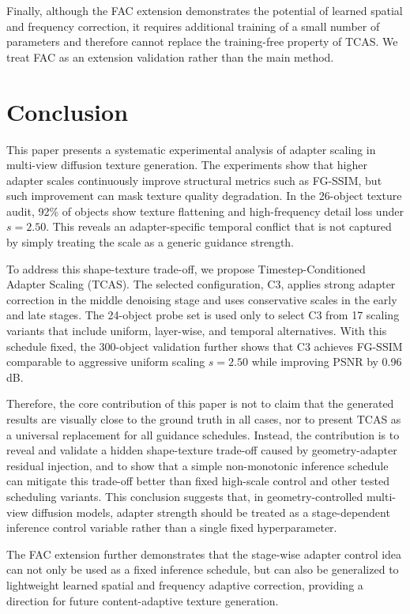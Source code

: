 \documentclass[times,twocolumn,final]{elsarticle}
\begin{document}
Finally, although the FAC extension demonstrates the potential of learned spatial and frequency correction, it requires additional training of a small number of parameters and therefore cannot replace the training-free property of TCAS. We treat FAC as an extension validation rather than the main method.


\section{Conclusion}
\label{sec:conclusion}

This paper presents a systematic experimental analysis of adapter scaling in multi-view diffusion texture generation. The experiments show that higher adapter scales continuously improve structural metrics such as FG-SSIM, but such improvement can mask texture quality degradation. In the 26-object texture audit, 92\% of objects show texture flattening and high-frequency detail loss under $s = 2.50$. This reveals an adapter-specific temporal conflict that is not captured by simply treating the scale as a generic guidance strength.

To address this shape-texture trade-off, we propose Timestep-Conditioned Adapter Scaling (TCAS). The selected configuration, C3, applies strong adapter correction in the middle denoising stage and uses conservative scales in the early and late stages. The 24-object probe set is used only to select C3 from 17 scaling variants that include uniform, layer-wise, and temporal alternatives. With this schedule fixed, the 300-object validation further shows that C3 achieves FG-SSIM comparable to aggressive uniform scaling $s = 2.50$ while improving PSNR by 0.96 dB.

Therefore, the core contribution of this paper is not to claim that the generated results are visually close to the ground truth in all cases, nor to present TCAS as a universal replacement for all guidance schedules. Instead, the contribution is to reveal and validate a hidden shape-texture trade-off caused by geometry-adapter residual injection, and to show that a simple non-monotonic inference schedule can mitigate this trade-off better than fixed high-scale control and other tested scheduling variants. This conclusion suggests that, in geometry-controlled multi-view diffusion models, adapter strength should be treated as a stage-dependent inference control variable rather than a single fixed hyperparameter.

The FAC extension further demonstrates that the stage-wise adapter control idea can not only be used as a fixed inference schedule, but can also be generalized to lightweight learned spatial and frequency adaptive correction, providing a direction for future content-adaptive texture generation.
\end{document}
